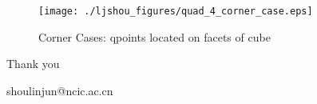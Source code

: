 \documentclass[mathserif]{beamer}
\begin{document}
\begin{CJK}{UTF8}{gkai}
\begin{frame}
	\begin{figure}
		\centering
		\texttt{[image: ./ljshou\_figures/quad\_4\_corner\_case.eps]}
		\caption{Corner Cases: qpoints located on facets of cube}
	\end{figure}

\end{frame}


\begin{frame}	
	\begin{block}
		\Huge{\centerline{Thank you}}
		\centerline{shoulinjun@ncic.ac.cn}
	\end{block}
\end{frame}
		
\end{CJK}
\end{document}
